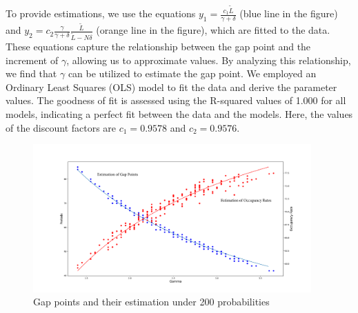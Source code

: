 To provide estimations, we use the equations $y_1 = \frac{c_1 \tilde{L}}{\gamma + \delta}$ (blue line in the figure) and $y_2 = c_2 \frac{\gamma}{\gamma + \delta} \frac{\tilde{L}}{\tilde{L}-N \delta}$ (orange line in the figure), which are fitted to the data. These equations capture the relationship between the gap point and the increment of $\gamma$, allowing us to approximate values. By analyzing this relationship, we find that $\gamma$ can be utilized to estimate the gap point. We employed an Ordinary Least Squares (OLS) model to fit the data and derive the parameter values. The goodness of fit is assessed using the R-squared values of 1.000 for all models, indicating a perfect fit between the data and the models. Here, the values of the discount factors are $c_1 = 0.9578$ and $c_2 = 0.9576$.

\begin{figure}[ht]
  \centering
    \includegraphics[width=0.95\textwidth]{./Figures/gamma_estimation.pdf}
  \caption{Gap points and their estimation under 200 probabilities}
\end{figure}





